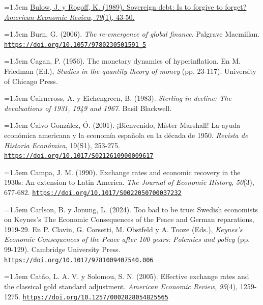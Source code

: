 \documentclass[10pt,a4paper]{article}
\begin{document}
{\sloppy\noindent\hangindent=1.5em \href{https://ideas.repec.org/a/aea/aecrev/v79y1989i1p43-50.html}{Bulow, J. y Rogoff, K. (1989). Sovereign debt: Is to forgive to forget? \textit{American Economic Review}, \textit{79}(1), 43-50.}\par}

{\sloppy\noindent\hangindent=1.5em Burn, G. (2006). \textit{The re-emergence of global finance}. Palgrave Macmillan. \href{https://doi.org/10.1057/9780230501591_5}{\nolinkurl{https://doi.org/10.1057/9780230501591_5}}\par}

\noindent\hangindent=1.5em Cagan, P. (1956). The monetary dynamics of hyperinflation. En M. Friedman (Ed.), \textit{Studies in the quantity theory of money} (pp. 23-117). University of Chicago Press.

{\sloppy\noindent\hangindent=1.5em Cairncross, A. y Eichengreen, B. (1983). \textit{Sterling in decline: The devaluations of 1931, 1949 and 1967}. Basil Blackwell.\par}

{\sloppy\noindent\hangindent=1.5em Calvo González, Ó. (2001). ¡Bienvenido, Míster Marshall! La ayuda económica americana y la economía española en la década de 1950. \textit{Revista de Historia Económica}, 19(S1), 253-275. \href{https://doi.org/10.1017/S0212610900009617}{\nolinkurl{https://doi.org/10.1017/S0212610900009617}}\par}

{\sloppy\noindent\hangindent=1.5em Campa, J. M. (1990). Exchange rates and economic recovery in the 1930s: An extension to Latin America. \textit{The Journal of Economic History}, \textit{50}(3), 677-682. \href{https://doi.org/10.1017/S0022050700037232}{\nolinkurl{https://doi.org/10.1017/S0022050700037232}}\par}

{\sloppy\noindent\hangindent=1.5em Carlson, B. y Jonung, L. (2024). Too bad to be true: Swedish economists on Keynes's The Economic Consequences of the Peace and German reparations, 1919-29. En P. Clavin, G. Corsetti, M. Obstfeld y A. Tooze (Eds.), \textit{Keynes's Economic Consequences of the Peace after 100 years: Polemics and policy} (pp. 99-129). Cambridge University Press. \href{https://doi.org/10.1017/9781009407540.006}{\nolinkurl{https://doi.org/10.1017/9781009407540.006}}\par}

{\sloppy\noindent\hangindent=1.5em Catão, L. A. V. y Solomou, S. N. (2005). Effective exchange rates and the classical gold standard adjustment. \textit{American Economic Review}, \textit{95}(4), 1259-1275. \href{https://doi.org/10.1257/0002828054825565}{\nolinkurl{https://doi.org/10.1257/0002828054825565}}\par}
\end{document}
